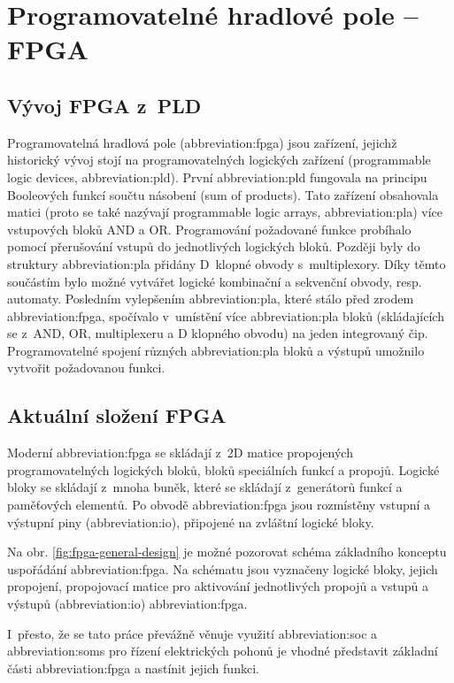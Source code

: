 \documentclass[a4paper, twoside, 11pt]{article}
\begin{document}
	\section{Programovatelné hradlové pole – FPGA}
		\subsection{Vývoj FPGA z~PLD}
		Programovatelná hradlová pole (\gls{abbreviation:fpga}) jsou zařízení, jejichž historický vývoj stojí na programovatelných logických zařízení (programmable logic devices, \gls{abbreviation:pld}). První \gls{abbreviation:pld} fungovala na principu Booleových funkcí součtu násobení (sum of products). Tato zařízení obsahovala matici (proto se také nazývají programmable logic arrays, \gls{abbreviation:pla}) více vstupových bloků AND a OR. Programování požadované funkce probíhalo pomocí přerušování vstupů do jednotlivých logických bloků. Později byly do struktury \gls{abbreviation:pla} přidány D~klopné obvody s~multiplexory. Díky těmto součástím bylo možné vytvářet logické kombinační a sekvenční obvody, resp. automaty. Posledním vylepšením \gls{abbreviation:pla}, které stálo před zrodem \gls{abbreviation:fpga}, spočívalo v~umístění více \gls{abbreviation:pla} bloků (skládajících se z~AND, OR, multiplexeru a D klopného obvodu) na jeden integrovaný čip. Programovatelné spojení různých \gls{abbreviation:pla} bloků a výstupů umožnilo vytvořit požadovanou funkci. \cite{Sass2010}\par

		\subsection{Aktuální složení FPGA}
		Moderní \gls{abbreviation:fpga} se skládají z~2D matice propojených programovatelných logických bloků, bloků speciálních funkcí a propojů. Logické bloky se skládají z~mnoha buněk, které se skládají z~generátorů funkcí a paměťových elementů. Po obvodě \gls{abbreviation:fpga} jsou rozmístěny vstupní a výstupní piny (\gls{abbreviation:io}), připojené na zvláštní logické bloky. \cite{Sass2010}\par
		Na obr. \ref{fig:fpga-general-design} je možné pozorovat schéma základního konceptu uspořádání \gls{abbreviation:fpga}. Na schématu jsou vyznačeny logické bloky, jejich propojení, propojovací matice pro aktivování jednotlivých propojů a vstupů a výstupů (\gls{abbreviation:io}) \gls{abbreviation:fpga}.\par
		I~přesto, že se tato práce převážně věnuje využití \gls{abbreviation:soc} a \gls{abbreviation:soms} pro řízení elektrických pohonů je vhodné představit základní části \gls{abbreviation:fpga} a nastínit jejich funkci.
\end{document}
